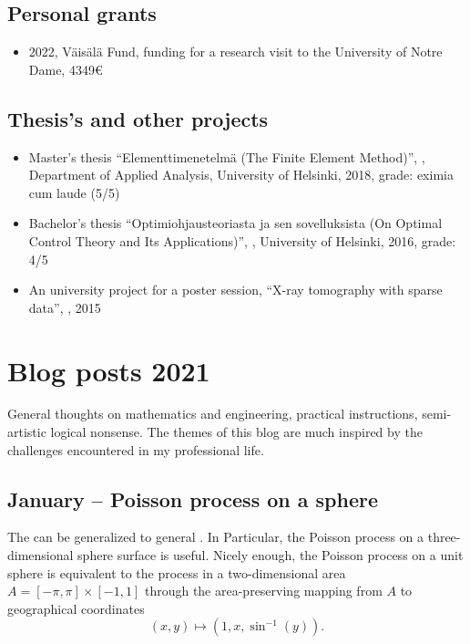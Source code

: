 \documentclass{article}
\begin{document}
        \subsection{Personal grants}
        \begin{itemize}
          \item 2022, Väisälä Fund, funding for a research visit to the University of Notre Dame, 4349€
        \end{itemize}
        \subsection{Thesis's and other projects}
        \begin{itemize}
        \item Master's thesis ``Elementtimenetelmä (The Finite Element Method)'', , Department of Applied Analysis, University of Helsinki, 2018, grade: eximia cum laude (5/5)
        \item Bachelor's thesis ``Optimiohjausteoriasta ja sen sovelluksista (On Optimal Control Theory and Its Applications)'', , University of Helsinki, 2016, grade: 4/5          
        \item An university project for a poster session, ``X-ray tomography with sparse data'', , 2015
          
        \end{itemize}
        
        

        \section{Blog posts 2021}
        General thoughts on mathematics and engineering, practical instructions, semi-artistic logical nonsense. The themes of this blog are much inspired by the challenges encountered in my professional life. 

        \subsection{January – Poisson process on a sphere}
        The  can be generalized to general . In Particular, the Poisson process on a three-dimensional sphere surface is useful. Nicely enough, the Poisson process on a unit sphere is equivalent to the process in a two-dimensional area $ A = [-\pi,\pi] \times [-1,1]$ through the area-preserving mapping from $A$ to geographical coordinates
        \begin{equation}
          (x,y) \mapsto (1,x,\sin^{-1}(y)) \nonumber.
        \end{equation}
\end{document}
